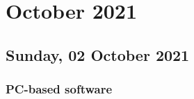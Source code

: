 \chapter[2021 October]{October 2021}

\section[2021/10/02]{Sunday, 02 October 2021}

\subsection{PC-based software}



\pendsign
